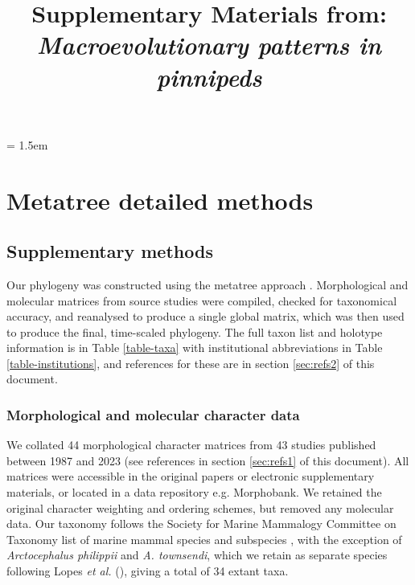 \documentclass[a4paper, 12pt]{article}
\title{Supplementary Materials from: \textit{Macroevolutionary patterns in pinnipeds}}
\author{}
\date{}
\begin{document}
\maketitle

\tableofcontents

\parindent = 1.5em
\addtolength{\parskip}{.3em}

\newpage
\section{Metatree detailed methods}

\subsection{Supplementary methods}

Our phylogeny was constructed using the metatree approach \citep{lloyd2021total,lloyd2016probabilistic}. Morphological and molecular matrices from source studies were compiled, checked for taxonomical accuracy, and reanalysed to produce a single global matrix, which was then used to produce the final, time-scaled phylogeny. The full taxon list and holotype information is in Table \ref{table-taxa} with institutional abbreviations in Table \ref{table-institutions}, and references for these are in section \ref{sec:refs2} of this document.

\subsubsection{Morphological and molecular character data}

We collated 44 morphological character matrices from 43 studies published between 1987 and 2023 (see references in section \ref{sec:refs1} of this document). All matrices were accessible in the original papers or electronic supplementary materials, or located in a data repository e.g. Morphobank. We retained the original character weighting and ordering schemes, but removed any molecular data. Our taxonomy follows the Society for Marine Mammalogy Committee on Taxonomy list of marine mammal species and subspecies \citep{committee-taxonomy}, with the exception of \textit{Arctocephalus philippii} and \textit{A. townsendi}, which we retain as separate species following Lopes \textit{et al.} (\citeyear{lopes2021phylogenomic}), giving a total of 34 extant taxa.
\end{document}
